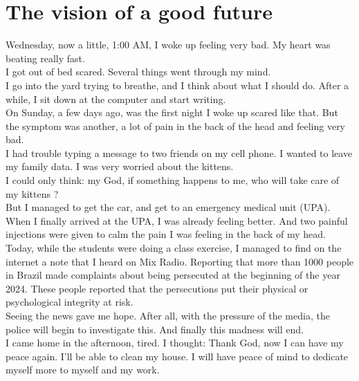 \documentclass[11pt]{book}
\begin{document}
\chapter{The vision of a good future}

\noindent Wednesday, now a little, 1:00 AM, I woke up feeling very bad. My heart was beating really fast. \\

\noindent I got out of bed scared. Several things went through my mind. \\

\noindent I go into the yard trying to breathe, and I think about what I should do. After a while, I sit down at the computer and start writing. \\

\noindent On Sunday, a few days ago, was the first night I woke up scared like that. But the symptom was another, a lot of pain in the back of the head and feeling very bad. \\

\noindent I had trouble typing a message to two friends on my cell phone. I wanted to leave my family data. I was very worried about the kittens. \\

\noindent I could only think: my God, if something happens to me, who will take care of my kittens ? \\

\noindent But I managed to get the car, and get to an emergency medical unit (UPA). \\

\noindent When I finally arrived at the UPA, I was already feeling better. And two painful injections were given to calm the pain I was feeling in the back of my head. \\

\noindent Today, while the students were doing a class exercise, I managed to find on the internet a note that I heard on Mix Radio. Reporting that more than 1000 people in Brazil made complaints about being persecuted at the beginning of the year 2024. These people reported that the persecutions put their physical or psychological integrity at risk. \\

\noindent Seeing the news gave me hope. After all, with the pressure of the media, the police will begin to investigate this. And finally this madness will end. \\

\noindent I came home in the afternoon, tired. I thought: Thank God, now I can have my peace again. I'll be able to clean my house. I will have peace of mind to dedicate myself more to myself and my work. \\
\end{document}
